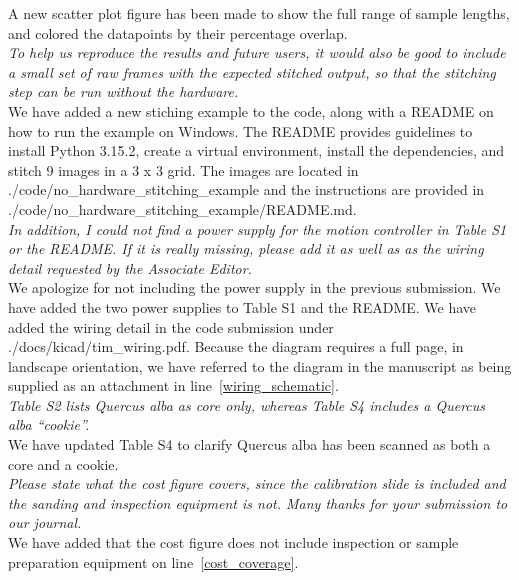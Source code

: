 \documentclass[12pt,a4paper]{article}
\newcommand{\lr}[1]{line~\ref{#1}}
\begin{document}
A new scatter plot figure has been made to show the full range of sample lengths, and colored the datapoints by their percentage overlap. \\

\emph{To help us reproduce the results and future users, it would also be good to include a small set of raw frames with the expected stitched output, so that the stitching step can be run without the hardware.} \\

We have added a new stiching example to the code, along with a README on how to run the example on Windows. The README provides guidelines to install Python 3.15.2, create a virtual environment, install the dependencies, and stitch 9 images in a 3 x 3 grid. The images are located in ./code/no\_hardware\_stitching\_example and the instructions are provided in ./code/no\_hardware\_stitching\_example/README.md. \\

\emph{In addition, I could not find a power supply for the motion controller in Table S1 or the README. If it is really missing, please add it as well as as the wiring detail requested by the Associate Editor.} \\

We apologize for not including the power supply in the previous submission. We have added the two power supplies to Table S1 and the README. We have added the wiring detail in the code submission under ./docs/kicad/tim\_wiring.pdf. Because the diagram requires a full page, in landscape orientation, we have referred to the diagram in the manuscript as being supplied as an attachment in \lr{wiring_schematic}. \\

\emph{Table S2 lists Quercus alba as core only, whereas Table S4 includes a Quercus alba “cookie”.} \\

We have updated Table S4 to clarify Quercus alba has been scanned as both a core and a cookie. \\

\emph{Please state what the cost figure covers, since the calibration slide is included and the sanding and inspection equipment is not.  Many thanks for your submission to our journal.} \\

We have added that the cost figure does not include inspection or sample preparation equipment on \lr{cost_coverage}. \\
\end{document}
